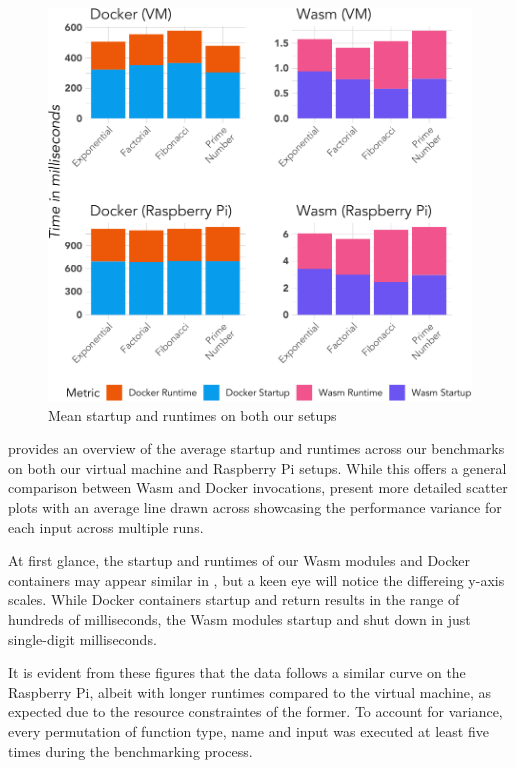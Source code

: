 \documentclass[
  table]{report}
\begin{document}
\begin{figure}[H]

{\centering \includegraphics{thesis_files/figure-latex/avg-efficiency-nrec-rpi-1} 

}

\caption{Mean startup and runtimes on both our setups}\label{fig:avg-efficiency-nrec-rpi}
\end{figure}

 provides an overview of the average
startup and runtimes across our benchmarks on both our virtual machine
and Raspberry Pi setups. While this offers a general comparison between
\ac{Wasm} and Docker invocations,
 present more detailed
scatter plots with an average line drawn across showcasing the
performance variance for each input across multiple runs.

At first glance, the startup and runtimes of our \ac{Wasm} modules and
Docker containers may appear similar in
, but a keen eye will notice the
differeing y-axis scales. While Docker containers startup and return
results in the range of hundreds of milliseconds, the \ac{Wasm} modules
startup and shut down in just single-digit milliseconds.

It is evident from these figures that the data follows a similar curve
on the Raspberry Pi, albeit with longer runtimes compared to the virtual
machine, as expected due to the resource constraintes of the former. To
account for variance, every permutation of function type, name and input
was executed at least five times during the benchmarking process.
\end{document}

